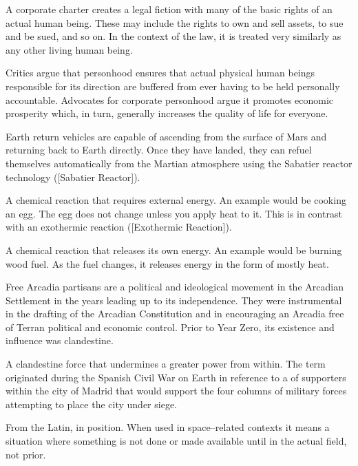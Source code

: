 A corporate charter creates a legal fiction with many of the basic rights of an actual human being. These may include the rights to own and sell assets, to sue and be sued, and so on. In the context of the law, it is treated very similarly as any other living human being.

Critics argue that personhood ensures that actual physical human beings responsible for its direction are buffered from ever having to be held personally accountable. Advocates for corporate personhood argue it promotes economic prosperity which, in turn, generally increases the quality of life for everyone.

Earth return vehicles are capable of ascending from the surface of Mars and returning back to Earth directly. Once they have landed, they can refuel themselves automatically from the Martian atmosphere using the Sabatier reactor technology ([Sabatier Reactor]).

A chemical reaction that requires external energy. An example would be cooking an egg. The egg does not change unless you apply heat to it. This is in contrast with an exothermic reaction ([Exothermic Reaction]).

A chemical reaction that releases its own energy. An example would be burning wood fuel. As the fuel changes, it releases energy in the form of mostly heat.

Free Arcadia partisans are a political and ideological movement in the Arcadian Settlement in the years leading up to its independence. They were instrumental in the drafting of the Arcadian Constitution and in encouraging an Arcadia free of Terran political and economic control. Prior to Year Zero, its existence and influence was clandestine.

A clandestine force that undermines a greater power from within. The term originated during the Spanish Civil War on Earth in reference to a  of supporters within the city of Madrid that would support the four columns of military forces attempting to place the city under siege.

From the Latin, in position. When used in space--related contexts it means a situation where something is not done or made available until in the actual field, not prior.

